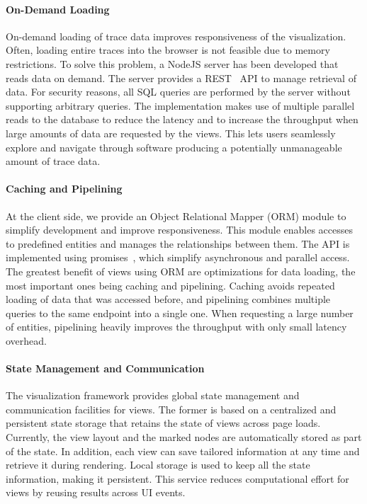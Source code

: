 \paragraph{On-Demand Loading}
On-demand loading of trace data improves responsiveness of the visualization.
Often, loading entire traces into the browser is not feasible due to memory
restrictions. To solve this problem, a NodeJS server has been developed that
reads data on demand. The server provides a REST~\cite{rest} API to manage
retrieval of data. For security reasons, all SQL queries are performed by the
server without supporting arbitrary queries. The implementation makes use of
multiple parallel reads to the database to reduce the latency and to increase
the throughput when large amounts of data are requested by the views. This lets
users seamlessly explore and navigate through software producing a potentially
unmanageable amount of trace data.

\paragraph{Caching and Pipelining}
At the client side, we provide an Object Relational Mapper (ORM) module to
simplify development and improve responsiveness. This module enables accesses
to predefined entities and manages the relationships between them. The API is
implemented using promises~\cite{promises}, which simplify asynchronous and
parallel access. The greatest benefit of views using ORM are optimizations
for data loading, the most important ones being caching and pipelining. Caching
avoids repeated loading of data that was accessed before, and pipelining
combines multiple queries to the same endpoint into a single one. When
requesting a large number of entities, pipelining heavily improves the
throughput with only small latency overhead.

\paragraph{State Management and Communication}
The visualization framework provides global state management and communication
facilities for views. The former is based on a centralized and persistent state
storage that retains the state of views across page loads. Currently,
the view layout and the marked nodes are automatically stored as part of the
state. In addition, each view can save tailored information at any time and
retrieve it during rendering. Local storage is used to keep all the state
information, making it persistent. This service reduces computational effort
for views by reusing results across UI events.

